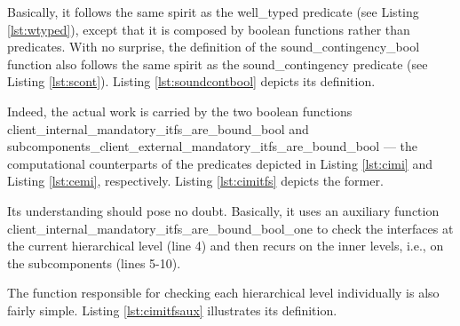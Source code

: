 		
			
	
			
	\noindent Basically, it follows the same spirit as the \textsf{well\_typed} predicate (see Listing \ref{lst:wtyped}),
	except that it is composed by boolean functions rather than predicates. With no surprise, the definition
	of the \textsf{sound\_contingency\_bool} function also follows the same spirit as the \textsf{sound\_contingency}
	predicate (see Listing \ref{lst:scont}). Listing \ref{lst:soundcontbool} depicts its definition.	
	
		
	
	
	\noindent Indeed, the actual work is carried by the two boolean functions
	\textsf{client\_internal\_mandatory\_itfs\_are\_bound\_bool} and 
	\textsf{subcomponents\_client\_external\_mandatory\_itfs\_are\_bound\_bool}
	--- the computational counterparts of the predicates depicted in Listing \ref{lst:cimi} 
	and Listing \ref{lst:cemi}, respectively. Listing \ref{lst:cimitfs} depicts the former.		


	


   \noindent %
   Its understanding should pose no doubt. Basically, it uses an auxiliary function
   \textsf{client\_internal\_mandatory\_itfs\_are\_bound\_bool\_one} to check the \textsf{interface}s at the current 
   hierarchical level (line 4) and then recurs on the inner levels, i.e., on the 
   sub\textsf{component}s (lines 5-10).
   
	The function responsible for checking each hierarchical level individually is also fairly simple. Listing
	\ref{lst:cimitfsaux} illustrates its definition.

	


